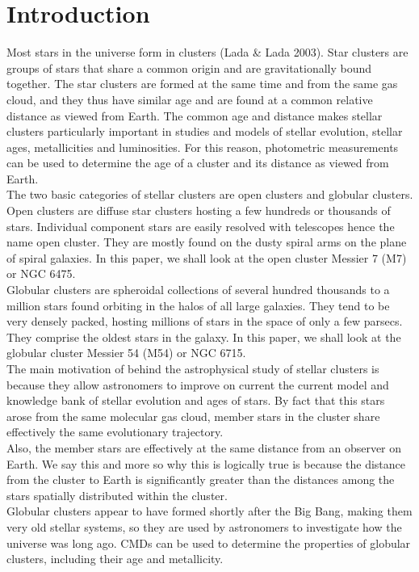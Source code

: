 \documentclass[12pt]{article}
\begin{document}
	\section{Introduction}
	\label{sec:intro}
	Most stars in the universe form in clusters (Lada \& Lada 2003). Star clusters are groups of stars that share a common origin and are gravitationally bound together. The star clusters are formed at the same time and from the same gas cloud, and they thus have similar age and are found at a common relative distance as viewed from Earth. The common age and distance makes stellar clusters particularly important in studies and models of stellar evolution, stellar ages, metallicities and luminosities. For this reason, photometric measurements can be used to determine the age of a cluster and its distance as viewed from Earth.\\
	The two basic categories of stellar clusters are open clusters and globular clusters. Open clusters are diffuse star clusters hosting a few hundreds or thousands of stars. Individual component stars are easily resolved with telescopes hence the name open cluster. They are mostly found on the dusty spiral arms on the plane of spiral galaxies. In this paper, we shall look at the open cluster Messier 7 (M7) or NGC 6475.\\
	Globular clusters are spheroidal collections of several hundred thousands to a million stars found orbiting in the halos of all large galaxies. They tend to be very densely packed, hosting millions of stars in the space of only a few parsecs. They comprise the oldest stars in the galaxy. In this paper, we shall look at the globular cluster Messier 54 (M54) or NGC 6715.\\	
	The main motivation of behind the astrophysical study of stellar clusters is because they allow astronomers to improve on current the current model and knowledge bank of stellar evolution and ages of stars. By fact that this stars arose from the same molecular gas cloud, member stars in the cluster share effectively the same evolutionary trajectory.\\
	Also, the member stars are effectively at the same distance from an observer on Earth. We say this and more so why this is logically true is because the distance from the cluster to Earth is significantly greater than the distances among the stars spatially distributed within the cluster.\\
	Globular clusters appear to have formed shortly after the Big Bang, making them very old stellar systems, so they are used by astronomers to investigate how the universe was long ago. CMDs can be used to determine the properties of globular clusters, including their age and metallicity.\\
\end{document}
